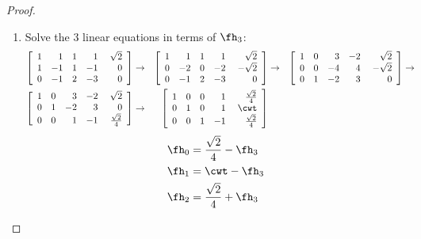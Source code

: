 \begin{proof}
\begin{enumerate}
\item Solve the 3 linear equations in terms of $\fh_3$:
\begin{align*}
\left[\begin{array}{rrrr@{\hspace{3ex}}r}
    1 &  1 &  1 &  1 & \sqrt{2}   \\
    1 & -1 &  1 & -1 & 0          \\
    0 & -1 &  2 & -3 & 0
\end{array}\right]
&\rightarrow&
\left[\begin{array}{rrrr@{\hspace{3ex}}r}
    1 &  1 &  1 &  1 & \sqrt{2}   \\
    0 & -2 &  0 & -2 &-\sqrt{2}   \\
    0 & -1 &  2 & -3 & 0
\end{array}\right]
&\rightarrow&
\left[\begin{array}{rrrr@{\hspace{3ex}}r}
    1 &  0 &  3 & -2 & \sqrt{2}   \\
    0 &  0 & -4 &  4 &-\sqrt{2}   \\
    0 &  1 & -2 &  3 & 0
\end{array}\right]
&\rightarrow&
\\
\left[\begin{array}{rrrr@{\hspace{3ex}}r}
    1 &  0 &  3 & -2 & \sqrt{2}   \\
    0 &  1 & -2 &  3 & 0          \\
    0 &  0 &  1 & -1 & \frac{\sqrt{2}}{4}
\end{array}\right]
&\rightarrow&
\left[\begin{array}{rrrr@{\hspace{3ex}}r}
    1 &  0 &  0 &  1 & \frac{\sqrt{2}}{4}   \\
    0 &  1 &  0 &  1 & \cwt   \\
    0 &  0 &  1 & -1 & \frac{\sqrt{2}}{4}
\end{array}\right]
\end{align*}
\begin{align*}
 \fh_0 &= \frac{\sqrt{2}}{4} -\fh_3  \\
 \fh_1 &= \cwt -\fh_3  \\
 \fh_2 &= \frac{\sqrt{2}}{4} +\fh_3  \\
\end{align*}


\end{enumerate}
\end{proof}
